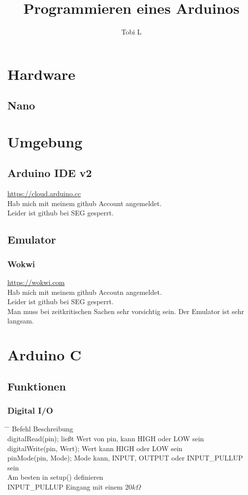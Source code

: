 \documentclass[10pt,a4paper,oneside]{article}
\author{Tobi L}
\title{Programmieren eines Arduinos}
\begin{document}
\maketitle
\tableofcontents
\section{Hardware}
\subsection{Nano}
\section{Umgebung}
\subsection{Arduino IDE v2}
\url{https://cloud.arduino.cc}\\
Hab mich mit meinem github Account angemeldet.\\  
Leider ist github bei SEG gesperrt.\\
\subsection{Emulator}
\subsubsection{Wokwi}
\url{https://wokwi.com}\\
Hab mich mit meinem github Accoutn angemeldet.\\ 
Leider ist github bei SEG gesperrt.\\ 
Man muss bei zeitkritischen Sachen sehr vorsichtig sein. Der Emulator ist sehr langsam.\\
\section{Arduino C}
\subsection{Funktionen}
\subsubsection{Digital I/O}
\begin{tabbing}
  \hspace*{1mm} \=\hspace{50mm} \= \kill
  \>Befehl \>Beschreibung \\
  \>digitalRead(pin); \> ließt Wert von pin, kann HIGH oder LOW sein \\
  \>digitalWrite(pin, Wert); \> Wert kann HIGH oder LOW sein\\ 
  \>pinMode(pin, Mode); \>   Mode kann, INPUT, OUTPUT oder INPUT\_PULLUP sein \\
  \> \> Am besten in setup() definieren\\ 
  \> \> INPUT\_PULLUP Eingang mit einem \begin{math}20k\Omega \end{math} \\
\end{tabbing}
\end{document}
